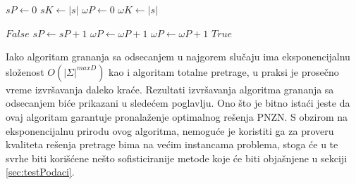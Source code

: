 \documentclass[12pt,oneside]{memoir}
\begin{document}
  \begin{algorithm}
    \caption{$\textrm{Podniska}(s,\omega)$}
    \label{alg:podNiska}
    \begin{algorithmic}[1]
    \State $sP \gets 0$ 
    \State $sK \gets |s|$ 
    \State $\omega P \gets 0$ 
    \State $\omega K \gets |s|$ 

    \State
        \State \Return $False$
        \State $sP \gets sP + 1$
        \State $\omega P \gets \omega P + 1$
      \Else
        \State $\omega P \gets \omega P + 1$
      \EndIf
    \EndWhile
    \State
    \State \Return $True$
    \end{algorithmic}
    \end{algorithm}
Iako algoritam grananja sa odsecanjem u najgorem slučaju ima eksponencijalnu složenost $O(|\Sigma|^{maxD})$
kao i algoritam totalne pretrage, u praksi je prosečno vreme izvršavanja
daleko kraće. Rezultati izvršavanja algoritma grananja sa odsecanjem biće prikazani u sledećem poglavlju.
Ono što je bitno istaći jeste da ovaj algoritam garantuje pronalaženje optimalnog rešenja PNZN.
S obzirom na eksponencijalnu prirodu ovog algoritma, nemoguće je koristiti ga
za proveru kvaliteta rešenja pretrage bima na većim instancama problema, stoga će u te svrhe biti korišćene
nešto sofisticiranije metode koje će biti objašnjene u sekciji \ref{sec:testPodaci}.

\end{document}
